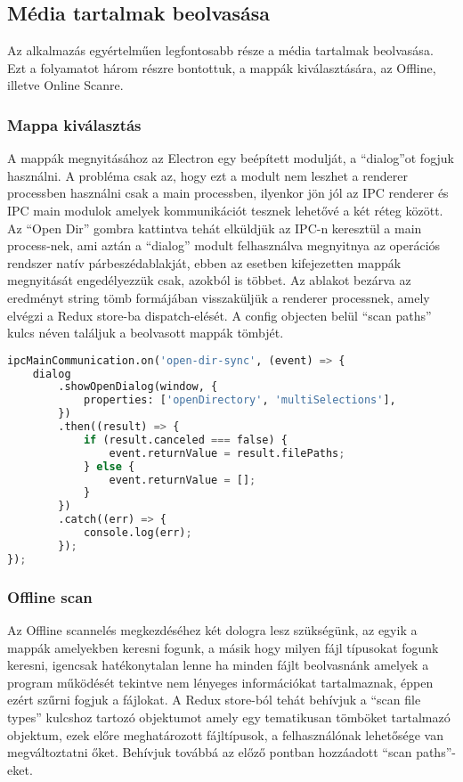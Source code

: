\subsection{Média tartalmak beolvasása}
Az alkalmazás egyértelműen legfontosabb része a média tartalmak beolvasása. Ezt a folyamatot három részre bontottuk, a mappák kiválasztására, az Offline, illetve Online Scanre.

\subsubsection{Mappa kiválasztás}
A mappák megnyitásához az Electron egy beépített modulját, a ``dialog''ot fogjuk használni. A probléma csak az, hogy ezt a modult nem leszhet a renderer processben használni csak a main processben, ilyenkor jön jól az IPC renderer és IPC main modulok amelyek kommunikációt tesznek lehetővé a két réteg között. Az ``Open Dir'' gombra kattintva tehát elküldjük az IPC-n keresztül a main process-nek, ami aztán a ``dialog'' modult felhasználva megnyitnya az operációs rendszer natív párbeszédablakját, ebben az esetben kifejezetten mappák megnyitását engedélyezzük csak, azokból is többet. Az ablakot bezárva az eredményt string tömb formájában visszaküljük a renderer processnek, amely elvégzi a Redux store-ba dispatch-elését. A config objecten belül ``scan paths'' kulcs néven találjuk a beolvasott mappák tömbjét.

\begin{lstlisting}[language={python}]
ipcMainCommunication.on('open-dir-sync', (event) => {
    dialog
        .showOpenDialog(window, {
            properties: ['openDirectory', 'multiSelections'],
        })
        .then((result) => {
            if (result.canceled === false) {
                event.returnValue = result.filePaths;
            } else {
                event.returnValue = [];
            }
        })
        .catch((err) => {
            console.log(err);
        });
});
\end{lstlisting}

\subsubsection{Offline scan}
Az Offline scannelés megkezdéséhez két dologra lesz szükségünk, az egyik a mappák amelyekben keresni fogunk, a másik hogy milyen fájl típusokat fogunk keresni, igencsak hatékonytalan lenne ha minden fájlt beolvasnánk amelyek a program működését tekintve nem lényeges információkat tartalmaznak, éppen ezért szűrni fogjuk a fájlokat. A Redux store-ból tehát behívjuk a ``scan file types'' kulcshoz tartozó objektumot amely egy tematikusan tömböket tartalmazó objektum, ezek előre meghatározott fájltípusok, a felhasználónak lehetősége van megváltoztatni őket. Behívjuk továbbá az előző pontban hozzáadott ``scan paths''-eket.

